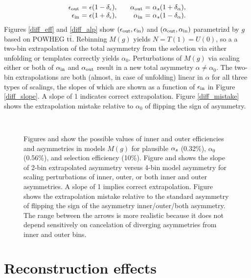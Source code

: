 \documentclass[letterpaper,11pt]{article}
\newcommand{\selected}{{\ensuremath s}}
\newcommand{\tot}{0}
\begin{document}
\[
\begin{array}{r@{\ =\ }l@{,\qquad}r@{\ =\ }l}
  \epsilon_\outr & \epsilon(1 - \depsilon) & \alpha_\outr & \alpha_\selected(1 + \dalpha),\\
  \epsilon_\innr & \epsilon(1+ \depsilon)  & \alpha_\innr & \alpha_\selected(1 - \dalpha).
\end{array}
\]
Figures \ref{diff_eff} and \ref{diff_alp} show
$(\epsilon_{\mathrm{out}},\epsilon_{\mathrm{in}})$ and $(\alpha_{\mathrm{out}},\alpha_{\mathrm{in}})$
parametrizd by $g$ based on POWHEG $\mathrm{t\bar{t}}$. Rebinning
$M(g)$ yields $N=T(1)=U(0)$, so a a two-bin extrapolation of the total
asymmetry from the selection via either unfolding or templates
correctly yields $\alpha_\tot$.  Perturbations of $M(g)$ via scaling
either or both of $\alpha_{\mathrm{in}}$ and $\alpha_{\mathrm{out}}$ result in a new
total asymmetry $\alpha\ne\alpha_0$.  The two-bin extrapolations are
both (almost, in case of unfolding) linear in $\alpha$ for all three
types of scalings, the slopes of which are shown as a function of
$\epsilon_{\mathrm{in}}$ in Figure \ref{diff_slope}.  A slope of 1 indicates
correct extrapolation.  Figure \ref{diff_mistake} shows the
extrapolation mistake relative to $\alpha_\tot$ of flipping the sign
of asymmetry.
\begin{figure}
  \centering
  \\
  \caption{\label{differential} Figures \protect{} and
    \protect{} show the possible values of inner and
    outer efficiencies and asymmetries in models $M(g)$ for plausible
    $\alpha_\selected$ (0.32\%), $\alpha_\tot$ (0.56\%), and selection
    efficiency (10\%).  Figure \protect{} and shows
    the slope of 2-bin extrapolated asymmetry versus 4-bin model
    asymmetry for scaling perturbations of inner, outer, or both inner
    and outer asymmetries.  A slope of 1 implies correct
    extrapolation.  Figure \protect{} shows the
    extrapolation mistake relative to the standard asymmetry of
    flipping the sign of the asymmetry inner/outer/both asymmetry.
    The range between the arrows is more realistic because it does not
    depend sensitively on cancelation of diverging asymmetries from
    inner and outer bins.}
\end{figure}


\section{Reconstruction effects}
\end{document}
